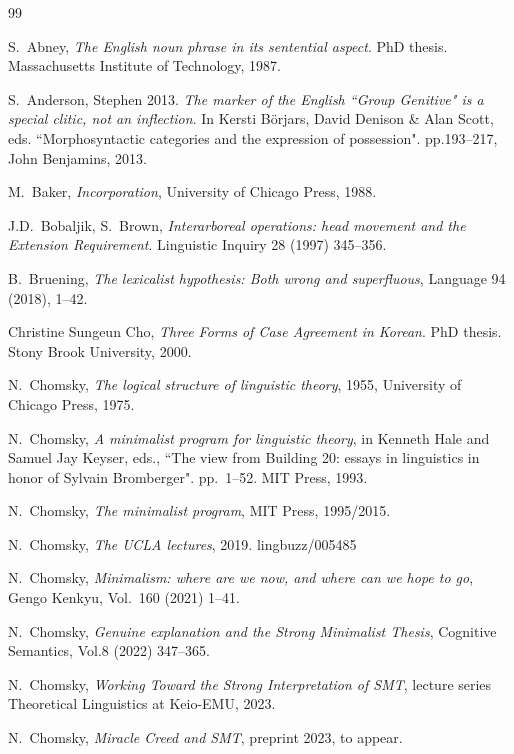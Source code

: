 \documentclass[12pt]{amsart}
\numberwithin{equation}{section}
\begin{document}
\begin{thebibliography}{99}

 S.~Abney, {\em The English noun phrase in its sentential aspect}. 
PhD thesis. Massachusetts Institute of Technology, 1987.

 S.~Anderson, Stephen 2013. {\em The marker of the 
English ``Group Genitive" is a special clitic, not an inflection}. 
In Kersti B\"orjars, David Denison \& Alan Scott, eds. ``Morphosyntactic 
categories and the expression of possession". pp.193--217, John Benjamins, 2013.

 M.~Baker, {\em Incorporation}, University of Chicago Press, 1988.

 J.D.~Bobaljik, S.~Brown, {\em Interarboreal operations: head 
movement and the Extension Requirement}. Linguistic Inquiry 28 (1997) 345--356.

 B.~Bruening, {\em The lexicalist hypothesis: Both wrong and superfluous}, 
Language 94 (2018), 1--42.

 Christine Sungeun Cho, {\em Three Forms of Case Agreement in Korean}. 
PhD thesis. Stony Brook University, 2000.

 N.~Chomsky, {\em The logical structure of linguistic theory}, 1955, 
University of Chicago Press, 1975.

 N.~Chomsky, {\em A minimalist program for linguistic theory}, 
in Kenneth Hale and Samuel Jay Keyser, eds., ``The view from Building 20: 
essays in linguistics in honor of Sylvain Bromberger". pp.~1--52. MIT Press, 1993.

 N.~Chomsky, {\em The minimalist program}, MIT Press, 1995/2015.

 N.~Chomsky, {\em The UCLA lectures}, 2019. lingbuzz/005485

 N.~Chomsky, {\em Minimalism:
where are we now, and where can we hope to go},  Gengo Kenkyu, Vol.~160 (2021) 1--41.

  N.~Chomsky, {\em Genuine explanation and the Strong Minimalist Thesis}, 
Cognitive Semantics, Vol.8 (2022) 347--365.

 N.~Chomsky, {\em Working Toward
the Strong Interpretation of SMT},
lecture series Theoretical Linguistics at Keio-EMU, 2023.

 N.~Chomsky, {\em Miracle Creed and SMT},  preprint 2023, to appear.


\end{thebibliography}
\end{document}
